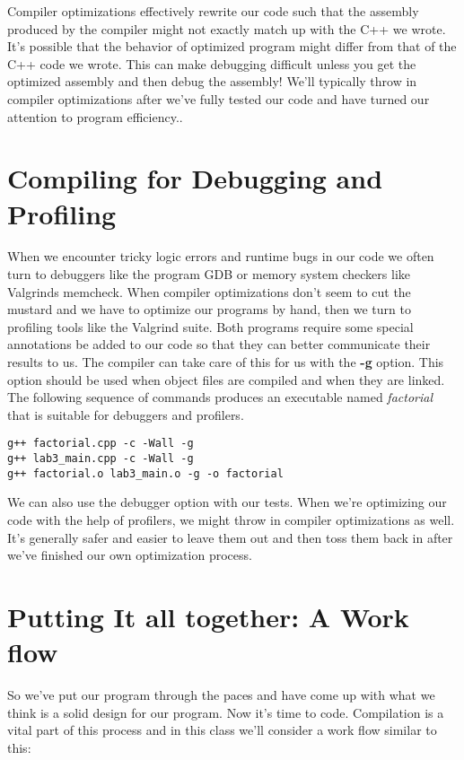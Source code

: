 \documentclass[]{tufte-handout}
\begin{document}
Compiler optimizations effectively rewrite our code such that the assembly produced by the compiler might not exactly match up with the C++ we wrote.  It's possible that the behavior of optimized program might differ from that of the C++ code we wrote. This can make debugging difficult unless you get the optimized assembly and then debug the assembly! We'll typically throw in compiler optimizations after we've fully tested our code and have turned our attention to program efficiency..   


\section{Compiling for Debugging and Profiling}

When we encounter tricky logic errors and runtime bugs in our code we often turn to debuggers like the program GDB or memory system checkers like Valgrinds memcheck.  When compiler optimizations don't seem to cut the mustard and we have to optimize our programs by hand, then we turn to profiling tools like the Valgrind suite.  Both programs require some special annotations be added to our code so that they can better communicate their results to us. The compiler can take care of this for us with the \textbf{-g} option. This option should be used when object files are compiled and when they are linked. The following sequence of commands produces an executable named \textit{factorial} that is suitable for debuggers and profilers.   
\begin{verbatim}
g++ factorial.cpp -c -Wall -g 
g++ lab3_main.cpp -c -Wall -g
g++ factorial.o lab3_main.o -g -o factorial
\end{verbatim}
We can also use the debugger option with our tests. When we're optimizing our code with the help of profilers, we might throw in compiler optimizations as well. It's generally safer and easier to leave them out and then toss them back in after we've finished our own optimization process.

\section{Putting It all together: A Work flow}

So we've put our program through the paces and have come up with what we think is a solid design for our program.  Now it's time to code. Compilation is a vital part of this process and in this class we'll consider a work flow similar to this:
\end{document}
